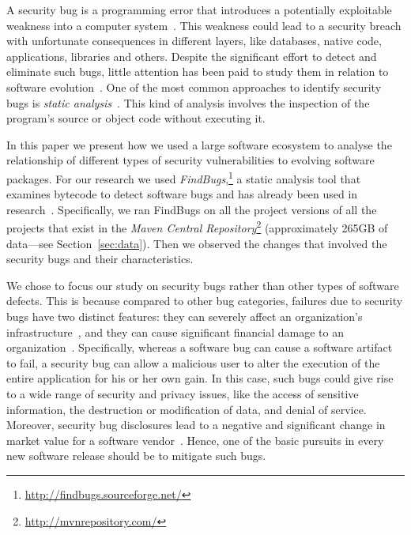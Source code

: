 \documentclass{sig-alternate}
\begin{document}
A security bug is a programming error that introduces a potentially exploitable
weakness into a computer system~\cite{SSL12}. This
weakness could lead to a security breach with unfortunate consequences in
different layers, like databases, native code, applications, libraries and
others. Despite the significant effort to detect and eliminate such
bugs, little attention has been paid to study them in relation to
software evolution~\cite{LRWPT97}. 
One of the most common approaches to identify security bugs is
{\it static analysis}~\cite{CW07}. This kind of analysis involves the
inspection of the program's source or object code without executing
it. 

In this paper we present how we used a large software ecosystem to analyse the
relationship of different types of security vulnerabilities to 
evolving software packages.
For our research we used {\it FindBugs},\footnote{\url{http://findbugs.sourceforge.net/}}
a static analysis tool that examines bytecode to detect software bugs and has already been used in
research~\cite{AP10,HP07,SHP06}.
Specifically, we ran FindBugs on all the project
versions of all the projects that exist in the
{\it Maven Central Repository}\footnote{\url{http://mvnrepository.com/}}
(approximately 265GB of data---see Section~\ref{sec:data}).
Then we observed the changes that involved the security bugs and their characteristics.

We chose to focus our study on security bugs rather than other types of
software defects. This is because compared to other bug categories,
failures due to security bugs have two distinct features:
they can severely affect an organization's infrastructure~\cite{SZ12}, and
they can cause significant financial damage to
an organization~\cite{TH04,BCL08}. 
Specifically,
whereas a software bug can cause a software artifact to fail,
a security bug can allow a malicious user to alter the execution
of the entire application for his or her own gain.
In this case, such bugs could give rise to a wide
range of security and privacy issues, like
the access of sensitive information,
the destruction or modification of data, and
denial of service.	
Moreover, security bug disclosures lead to a negative and significant change
in market value for a software vendor~\cite{TW07}.
Hence, one of the basic pursuits in every new software release should
be to mitigate such bugs.
\end{document}
